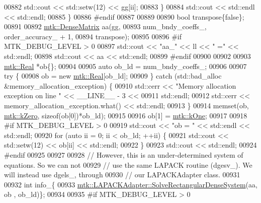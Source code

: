 \begin{DoxyCode}
{{00882         std::cout << std::setw(12) << gg[ii];
00883       \}
00884       std::cout << std::endl << std::endl;
00885     \}
00886 \textcolor{preprocessor}{    #endif}
00887 
00889 
00890     \textcolor{keywordtype}{bool} transpose\{\textcolor{keyword}{false}\};
00891 
00892     \hyperlink{classmtk_1_1DenseMatrix}{mtk::DenseMatrix} aa(gg,
00893                          num\_bndy\_coeffs\_, order\_accuracy\_ + 1,
00894                          transpose);
00895 
00896 \textcolor{preprocessor}{    #if MTK\_DEBUG\_LEVEL > 0}
00897     std::cout << \textcolor{stringliteral}{"aa\_"} << ll << \textcolor{stringliteral}{" ="} << std::endl;
00898     std::cout << aa << std::endl;
00899 \textcolor{preprocessor}{    #endif}
00900 
00902 
00903     \hyperlink{group__c01-roots_gac080bbbf5cbb5502c9f00405f894857d}{mtk::Real} *ob\{\};
00904 
00905     \textcolor{keyword}{auto} ob\_ld = num\_bndy\_coeffs\_;
00906 
00907     \textcolor{keywordflow}{try} \{
00908       ob = \textcolor{keyword}{new} \hyperlink{group__c01-roots_gac080bbbf5cbb5502c9f00405f894857d}{mtk::Real}[ob\_ld];
00909     \} \textcolor{keywordflow}{catch} (std::bad\_alloc &memory\_allocation\_exception) \{
00910       std::cerr << \textcolor{stringliteral}{"Memory allocation exception on line "} << \_\_LINE\_\_ - 3 <<
00911         std::endl;
00912       std::cerr << memory\_allocation\_exception.what() << std::endl;
00913     \}
00914     memset(ob, \hyperlink{group__c01-roots_ga59a451a5fae30d59649bcda274fea271}{mtk::kZero}, \textcolor{keyword}{sizeof}(ob[0])*ob\_ld);
00915 
00916     ob[1] = \hyperlink{group__c01-roots_ga26407c24d43b6b95480943340d285c71}{mtk::kOne};
00917 
00918 \textcolor{preprocessor}{    #if MTK\_DEBUG\_LEVEL > 0}
00919     std::cout << \textcolor{stringliteral}{"ob = "} << std::endl << std::endl;
00920     \textcolor{keywordflow}{for} (\textcolor{keyword}{auto} ii = 0; ii < ob\_ld; ++ii) \{
00921       std::cout << std::setw(12) << ob[ii] << std::endl;
00922     \}
00923     std::cout << std::endl;
00924 \textcolor{preprocessor}{    #endif}
00925 
00927 
00928     \textcolor{comment}{// However, this is an under-determined system of equations. So we can not}
00929     \textcolor{comment}{// use the same LAPACK routine (dgesv\_). We will instead use dgels\_, through}
00930     \textcolor{comment}{// our LAPACKAdapter class.}
00931 
00932     \textcolor{keywordtype}{int} info\_\{
00933       \hyperlink{classmtk_1_1LAPACKAdapter_a380f148ffdf96bae2f79ae28f1a6560c}{mtk::LAPACKAdapter::SolveRectangularDenseSystem}(aa, ob
      , ob\_ld)\};
00934 
00935 \textcolor{preprocessor}{    #if MTK\_DEBUG\_LEVEL > 0}
}}
\end{DoxyCode}
